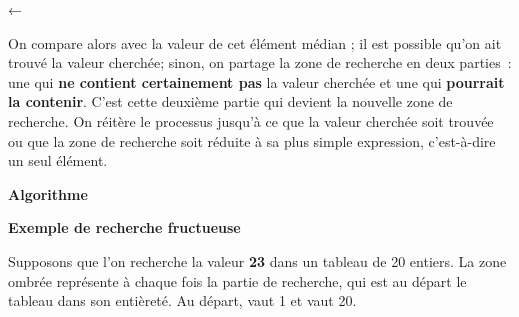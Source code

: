 	{\centering
	\textsf{←}{
	}
	\par}

	On compare alors 
	avec la valeur de cet élément médian ; il est possible qu’on ait trouvé
	la valeur cherchée; sinon, on partage la zone de recherche en deux
	parties~: une qui \textbf{ne contient certainement pas}
	la valeur cherchée et une qui \textbf{pourrait la
	contenir}. C’est cette deuxième partie qui 
	devient la nouvelle zone de recherche. On
	réitère le processus jusqu’à ce que la valeur cherchée soit trouvée ou
	que la zone de recherche soit réduite à sa plus simple expression,
	c’est-à-dire un seul élément.

	{\sffamily\bfseries
	Algorithme}
	
		
		{\sffamily\bfseries\upshape
		Exemple de recherche fructueuse}

		Supposons que l’on recherche la valeur
		\textbf{23} dans un
		tableau de 20 entiers. La zone ombrée représente à chaque fois la
		partie de recherche, qui est au départ le tableau dans son entièreté.
		Au départ,
		 vaut 1 et
			vaut 20.
			
